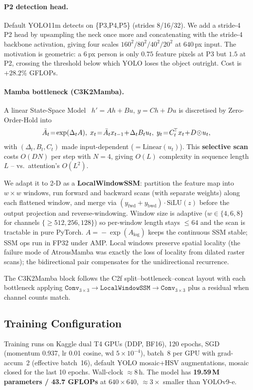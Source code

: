 \documentclass[11pt,a4paper]{article}
\begin{document}
\paragraph{P2 detection head.}
Default YOLO11m detects on \{P3,P4,P5\} (strides 8/16/32). We add a
stride-4 P2 head by upsampling the neck once more and concatenating
with the stride-4 backbone activation, giving four scales
$160^2/80^2/40^2/20^2$ at $640$\,px input. The motivation is
geometric: a 6\,px person is only $0.75$ feature pixels at P3 but
$1.5$ at P2, crossing the threshold below which YOLO loses the object
outright. Cost is $+28.2\%$ GFLOPs.

\paragraph{Mamba bottleneck (C3K2Mamba).}
A linear State-Space Model~\cite{gu2024mamba}
$h'\!=\!Ah+Bu,\,y\!=\!Ch+Du$ is discretised by Zero-Order-Hold into
\begin{equation}\label{eq:ssm}\small
\bar{A}_t\!=\!\exp(\Delta_t A),\;
x_t\!=\!\bar{A}_t x_{t-1}\!+\!\Delta_t B_t u_t,\;
y_t\!=\!C_t^{\!\top}x_t\!+\!D\!\odot\!u_t,
\end{equation}
with $(\Delta_t,B_t,C_t)$ made input-dependent
($=\mathrm{Linear}(u_t)$). This \textbf{selective scan} costs $O(DN)$
per step with $N\!=\!4$, giving $O(L)$ complexity in sequence length
$L$ -- vs.\ attention's $O(L^2)$.

We adapt it to 2-D as a \textbf{LocalWindowSSM}: partition the feature
map into $w\!\times\!w$ windows, run forward and backward scans (with
separate weights) along each flattened window, and merge via
$(y_{\text{fwd}}\!+\!y_{\text{bwd}})\!\cdot\!\mathrm{SiLU}(z)$ before
the output projection and reverse-windowing. Window size is adaptive
($w\!\in\!\{4,6,8\}$ for channels
$\{{\geq}512,256,128\}$) so per-window length stays $\le 64$ and the
scan is tractable in pure PyTorch. $A\!=\!-\exp(A_{\log})$ keeps the
continuous SSM stable; SSM ops run in FP32 under AMP. Local windows
preserve spatial locality (the failure mode of AtrousMamba was
exactly the loss of locality from dilated raster scans); the
bidirectional pair compensates for the unidirectional recurrence.

The C3K2Mamba block follows the C2f split--bottleneck--concat layout
with each bottleneck applying
$\texttt{Conv}_{3\!\times\!3}\!\to\!\texttt{LocalWindowSSM}\!\to\!\texttt{Conv}_{3\!\times\!3}$
plus a residual when channel counts match.

\subsection{Training Configuration}
Training runs on Kaggle dual T4 GPUs (DDP, BF16), 120 epochs, SGD
(momentum 0.937, lr 0.01 cosine, wd $5\!\times\!10^{-4}$), batch~8 per
GPU with grad-accum~2 (effective batch~16), default YOLO mosaic+HSV
augmentations, mosaic closed for the last 10 epochs. Wall-clock
$\approx\!8$\,h. The model has \textbf{19.59\,M parameters / 43.7
GFLOPs} at $640\!\times\!640$, $\approx\!3\times$ smaller than
YOLOv9-e.
\end{document}
